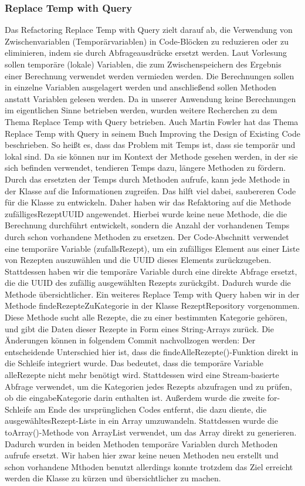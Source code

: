 \subsubsection{Replace Temp with Query}
Das Refactoring Replace Temp with Query zielt darauf ab, die Verwendung von Zwischenvariablen (Temporärvariablen) in Code-Blöcken zu reduzieren oder zu eliminieren, indem sie durch Abfrageausdrücke ersetzt werden. 
Laut Vorlesung sollen temporäre (lokale) Variablen, die zum Zwischenspeichern des Ergebnis einer Berechnung verwendet werden vermieden werden. Die Berechnungen sollen in einzelne Variablen ausgelagert werden und anschließend sollen Methoden anstatt Variablen gelesen werden. 
Da in unserer Anwendung keine Berechnungen im eigentlichen Sinne betrieben werden, wurden weitere Recherchen zu dem Thema Replace Temp with Query betrieben. Auch Martin Fowler hat das Thema Replace Temp with Query in seinem Buch \glqq Improving the Design of Existing Code \grqq{} beschrieben. So heißt es, dass das Problem mit Temps ist, dass sie temporär und lokal sind. Da sie können nur im Kontext der Methode gesehen werden, in der sie sich befinden verwendet, tendieren Temps dazu, längere Methoden zu fördern.
Durch das ersetzten der Temps durch Methoden aufrufe, kann jede Methode in der Klasse auf die Informationen zugreifen. Das hilft
viel dabei, saubereren Code für die Klasse zu entwickeln.
Daher haben wir das Refaktoring auf die Methode zufälligesRezeptUUID angewendet. Hierbei wurde keine neue Methode, die die Berechnung durchführt entwickelt, sondern die Anzahl der vorhandenen Temps durch schon vorhandene Methoden zu ersetzen. Der Code-Abschnitt verwendet eine temporäre Variable (zufallsRezept), um ein zufälliges Element aus einer Liste von Rezepten auszuwählen und die UUID dieses Elements zurückzugeben. Stattdessen haben wir die temporäre Variable durch eine direkte Abfrage ersetzt, die die UUID des zufällig ausgewählten Rezepts zurückgibt. Dadurch wurde die Methode übersichtlicher.
Ein weiteres Replace Temp with Query haben wir in der Methode findeRezepteZuKategorie in der Klasse RezeptRepository vorgenommen. Diese Methode sucht alle Rezepte, die zu einer bestimmten Kategorie gehören, und gibt die Daten dieser Rezepte in Form eines String-Arrays zurück. Die Änderungen können in folgendem Commit nachvollzogen werden: 
Der entscheidende Unterschied hier ist, dass die findeAlleRezepte()-Funktion direkt in die Schleife integriert wurde. Das bedeutet, dass die temporäre Variable alleRezepte nicht mehr benötigt wird. Stattdessen wird eine Stream-basierte Abfrage verwendet, um die Kategorien jedes Rezepts abzufragen und zu prüfen, ob die eingabeKategorie darin enthalten ist.
Außerdem wurde die zweite for-Schleife am Ende des ursprünglichen Codes entfernt, die dazu diente, die ausgewähltesRezept-Liste in ein Array umzuwandeln. Stattdessen wurde die toArray()-Methode von ArrayList verwendet, um das Array direkt zu generieren. 
Dadurch wurden in beiden Methoden temporäre Variablen durch Methoden aufrufe ersetzt. Wir haben hier zwar keine neuen Methoden neu erstellt und schon vorhandene Mthoden benutzt allerdings konnte trotzdem das Ziel erreicht werden die Klasse zu kürzen und übersichtlicher zu machen.